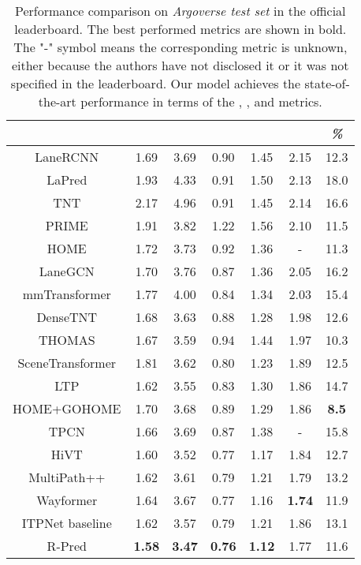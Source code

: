 \documentclass[10pt,twocolumn,letterpaper]{article}
\begin{document}
\begin{table*} [ht!] 
    \centering
    \begin{tabular}{c||cccccc}
       \bottomrule[1.5pt]
         &  &  &  &  &  & \textit{\%}\\\hline\hline
LaneRCNN\cite{LaneRCNN}         & 1.69 & 3.69 & 0.90 & 1.45 & 2.15 & 12.3\\   
        LaPred\cite{LaPred}             & 1.93 & 4.33 & 0.91 & 1.50 & 2.13 & 18.0\\
        TNT\cite{TNT}                   & 2.17 & 4.96 & 0.91 & 1.45 & 2.14 & 16.6\\ PRIME\cite{PRIME}               & 1.91 & 3.82 & 1.22 & 1.56 & 2.10 & 11.5\\
HOME\cite{home}                 & 1.72 & 3.73 & 0.92 & 1.36 & -    & 11.3 \\
        LaneGCN\cite{LaneGCN}           & 1.70 & 3.76 & 0.87 & 1.36 & 2.05 & 16.2\\ mmTransformer\cite{mmTransformer}& 1.77 & 4.00 & 0.84 & 1.34 & 2.03 & 15.4\\
        DenseTNT\cite{DenseTNT}         & 1.68 & 3.63 & 0.88 & 1.28 & 1.98 & 12.6\\
        THOMAS\cite{THOMAS}             & 1.67 & 3.59 & 0.94 & 1.44 & 1.97 & 10.3\\
        SceneTransformer\cite{Scenetransformer}& 1.81 & 3.62 & 0.80 & 1.23 & 1.89 & 12.5\\
        LTP\cite{LTP}                   & 1.62 & 3.55 & 0.83 & 1.30 & 1.86 & 14.7\\
HOME+GOHOME\cite{gohome}        & 1.70 & 3.68 & 0.89 & 1.29 & 1.86 & \bf 8.5 \\
        TPCN\cite{TPCN}                 & 1.66 & 3.69 & 0.87 & 1.38 & -    & 15.8\\   HiVT\cite{HiVT}                 & 1.60 & 3.52 & 0.77 & 1.17 & 1.84 & 12.7\\
        MultiPath++\cite{multipath++}   & 1.62 & 3.61 & 0.79 & 1.21 & 1.79 & 13.2\\
        Wayformer\cite{Wayformer}       & 1.64 & 3.67 & 0.77 & 1.16 & \bf 1.74 & 11.9\\        
        \Xhline{0.9pt}
ITPNet baseline                 & 1.62 & 3.57 & 0.79 & 1.21 & 1.86 & 13.1\\
        R-Pred       & \bf 1.58 & \bf 3.47 & \bf 0.76 & \bf 1.12 &  1.77 & 11.6 \\\bottomrule[1.5pt]
\end{tabular}
    \vspace{2pt}
    \caption{Performance comparison on {\it Argoverse test set} in the official leaderboard. The best performed metrics are shown in bold. The "-" symbol means the corresponding metric is unknown, either because the authors have not disclosed it or it was not specified in the leaderboard. Our model achieves the state-of-the-art performance in terms of the , ,  and  metrics.}
        \label{argoverse result}
\end{table*}
\end{document}
